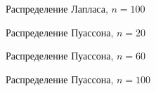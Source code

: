 \begin{figure}[H]
		\caption{Распределение Лапласа, $n=100$}
		\label{fig:kde_laplace100}
	\end{figure}

\begin{figure}[H]
		\caption{Распределение Пуассона, $n=20$}
		\label{fig:kde_poisson20}
	\end{figure}

\begin{figure}[H]
		\caption{Распределение Пуассона, $n=60$}
		\label{fig:kde_poisson60}
	\end{figure}

\begin{figure}[H]
		\caption{Распределение Пуассона, $n=100$}
		\label{fig:kde_poisson100}
	\end{figure}

